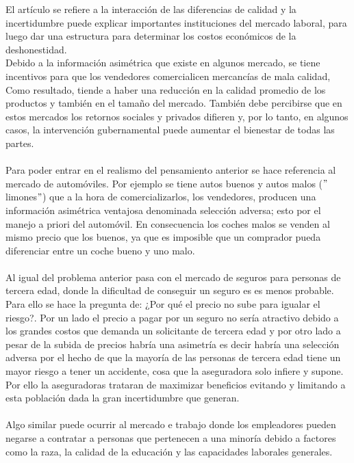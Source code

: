 \begin{multicols}{2}
El artículo se refiere a la interacción de las diferencias de calidad y la incertidumbre puede explicar importantes instituciones del mercado laboral, para luego dar una estructura para determinar los costos económicos de la deshonestidad.\\ 
 Debido a la información asimétrica que existe en algunos mercado, se tiene incentivos para que los vendedores comercialicen mercancías de mala calidad, Como resultado, tiende a haber una reducción en la calidad promedio de los productos y también en el tamaño del mercado. También debe percibirse que en estos mercados los retornos sociales y privados difieren y, por lo tanto, en algunos casos, la intervención gubernamental puede aumentar el bienestar de todas las partes. \\\\
 Para poder entrar en el realismo del pensamiento anterior se hace referencia al mercado de automóviles. Por ejemplo se tiene autos buenos y autos malos ($"$limones$"$) que a la hora de comercializarlos, los vendedores, producen una información asimétrica ventajosa denominada selección adversa; esto por el manejo a priori del automóvil. En consecuencia los coches malos se venden al mismo precio que los buenos, ya que es imposible que un comprador pueda diferenciar entre un coche bueno y uno malo.\\\\
 Al igual del problema anterior pasa con el mercado de seguros para personas de tercera edad, donde la dificultad de conseguir un seguro es es menos probable. Para ello se hace la pregunta de: ¿Por qué el precio no sube para igualar el riesgo?. Por un lado el precio a pagar por un seguro no sería atractivo debido a los grandes costos que demanda un solicitante de tercera edad y por otro lado a pesar de la subida de precios habría una asimetría  es decir habría una selección adversa por el hecho de que la mayoría de las personas de tercera edad tiene un mayor riesgo a tener un accidente, cosa que la aseguradora solo infiere y supone. Por ello la aseguradoras trataran de maximizar beneficios evitando  y limitando a esta población dada la gran incertidumbre que generan.\\\\
 Algo similar puede ocurrir al mercado e trabajo donde los empleadores pueden negarse a contratar a personas que pertenecen a una minoría debido a factores como la raza, la calidad de la educación y las capacidades laborales generales.\\\\

\end{multicols}
